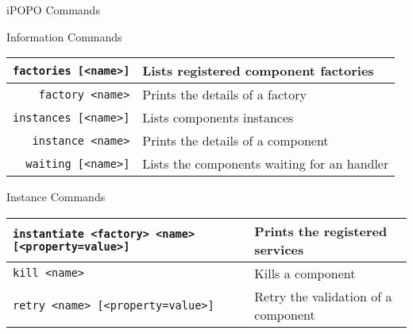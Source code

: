 \begin{frame}{iPOPO Commands}
\begin{small}
\begin{block}{Information Commands}
\centering
\begin{tabular}{r l}
\texttt{factories {\scriptsize [<name>]}} & Lists registered component factories \\
\hline
\texttt{factory {\scriptsize <name>}} & Prints the details of a factory \\
\hline
\texttt{instances {\scriptsize [<name>]}} & Lists components instances \\
\hline
\texttt{instance {\scriptsize <name>}} & Prints the details of a component \\
\hline
\texttt{waiting {\scriptsize [<name>]}} & Lists the components waiting for an handler \\
\end{tabular}
\end{block}

\begin{block}{Instance Commands}
\centering
\begin{tabular}{p{} l}
\texttt{instantiate {\scriptsize <factory> <name> [<property=value>]}} & Prints the registered services \\
\hline
\texttt{kill {\scriptsize <name>}} & Kills a component \\
\hline
\texttt{retry {\scriptsize <name> [<property=value>]}} & Retry the validation of a component \\
\end{tabular}
\end{block}
\end{small}
\end{frame}

